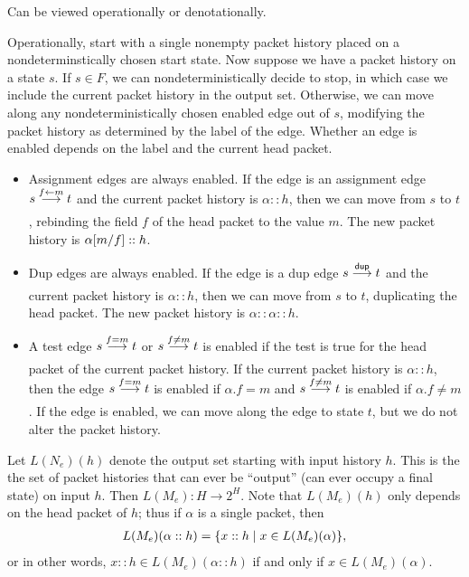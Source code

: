 \documentclass{article}
\newcommand\pdup{\mathop{\mathsf{dup}}}
\renewcommand\powerset[1]{2^{#1}}
\begin{document}
Can be viewed operationally or denotationally.

Operationally, start with a single nonempty packet history placed on a nondeterminstically chosen start state. Now suppose we have a packet history on a state $s$. If $s\in F$, we can nondeterministically decide to stop, in which case we include the current packet history in the output set. Otherwise, we can move along any nondeterministically chosen enabled edge out of $s$, modifying the packet history as determined by the label of the edge. Whether an edge is enabled depends on the label and the current head packet.
\begin{itemize}
\item
Assignment edges are always enabled. If the edge is an assignment edge $s\underset{}{\overset{f\leftarrow m}\longrightarrow}t$ and the current packet history is $\alpha::h$, then we can move from $s$ to $t$, rebinding the field $f$ of the head packet to the value $m$. The new packet history is $\alpha[m/f]::h$.
\item
Dup edges are always enabled. If the edge is a dup edge $s\goesto{\pdup}{}t$ and the current packet history is
$\alpha::h$, then we can move from $s$ to $t$, duplicating the head packet. The new packet history is $\alpha::\alpha::h$.
\item
A test edge $s\underset{}{\overset{f=m}\longrightarrow}t$ or $s\underset{}{\overset{f\neq m}\longrightarrow}t$ is enabled if the test is true for the head packet of the current packet history. If the current packet history is $\alpha::h$, then the edge $s\underset{}{\overset{f=m}\longrightarrow}t$ is enabled if $\alpha.f=m$ and $s\underset{}{\overset{f\neq m}\longrightarrow}t$ is enabled if $\alpha.f\neq m$. If the edge is enabled, we can move along the edge to state $t$, but we do not alter the packet history.
\end{itemize}
Let $L(N_e)(h)$ denote the output set starting with input history $h$. This is the the set of packet histories that can ever be ``output'' (can ever occupy a final state) on input $h$. Then $L(M_e):H\to\powerset H$. Note that $L(M_e)(h)$ only depends on the head packet of $h$; thus if $\alpha$ is a single packet, then
\begin{align*}
L(M_e)(\alpha::h) = \{x::h \mid x\in L(M_e)(\alpha)\},
\end{align*}
or in other words, $x::h\in L(M_e)(\alpha::h)$ if and only if $x\in L(M_e)(\alpha)$.
\end{document}
